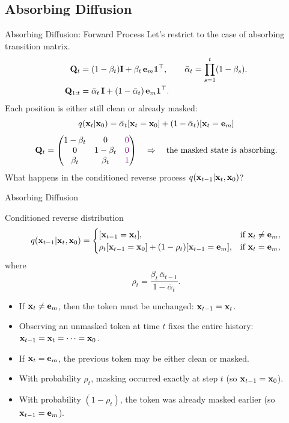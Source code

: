 \documentclass{beamer}
\begin{document}
\subsection{Absorbing Diffusion}
\begin{frame}{Absorbing Diffusion: Forward Process}
	Let's restrict to the case of absorbing transition matrix.
	\vspace{-0.3cm}
	\begin{align*}
		\mathbf{Q}_t &= (1-\beta_t)\mathbf{I} + \beta_t\, \mathbf{e}_m \mathbf{1}^\top,
		\qquad
		\bar\alpha_t = \prod_{s=1}^t (1-\beta_s). \\
		\mathbf{Q}_{1:t} &= \bar\alpha_t\,\mathbf{I} + (1-\bar\alpha_t)\,\mathbf{e}_m \mathbf{1}^\top.
	\end{align*}
	\eqpause
	Each position is either still clean or already masked:
	\[
		q(\mathbf{x}_t | \mathbf{x}_0) = \bar\alpha_t [\mathbf{x}_t = \mathbf{x}_0] + (1 - \bar\alpha_t) [\mathbf{x}_t = \mathbf{e}_m]
	\]
	\eqpause
	\[
		\mathbf{Q}_t =
		\begin{pmatrix}
			1-\beta_t & 0           & \color{violet}{0} \\
			0           & 1-\beta_t & \color{violet}{0} \\
			\beta_t     & \beta_t     & \color{violet}{1}
		\end{pmatrix} 
		\quad \Rightarrow \quad 
		\text{the masked state is absorbing.}
	\]
	\eqpause
	What happens in the conditioned reverse process
	$q(\mathbf{x}_{t-1} | \mathbf{x}_t, \mathbf{x}_0)$?
\end{frame}
\begin{frame}{Absorbing Diffusion}
	\begin{block}{Conditioned reverse distribution}
		\vspace{-0.5cm}
		\[
			q(\mathbf{x}_{t-1} | \mathbf{x}_t, \mathbf{x}_0) =
			\begin{cases}
				[\mathbf{x}_{t-1} = \mathbf{x}_t], 
				& \text{if } \mathbf{x}_t \neq \mathbf{e}_m, \\
				\rho_t[\mathbf{x}_{t-1} = \mathbf{x}_0] + (1-\rho_t)[\mathbf{x}_{t-1} = \mathbf{e}_m], 
				& \text{if } \mathbf{x}_t = \mathbf{e}_m,
			\end{cases}
		\]
		where
		\[
		\rho_t = \frac{\beta_t\,\bar\alpha_{t-1}}{1-\bar\alpha_t}.
		\]
	\end{block}
	\eqpause
	\begin{itemize}
		\item If $\mathbf{x}_t \neq \mathbf{e}_m$, then the token must be unchanged:
		$\mathbf{x}_{t-1} = \mathbf{x}_t$.
		\item Observing an unmasked token at time $t$ fixes the entire history:
		$\mathbf{x}_{t-1} = \mathbf{x}_t = \cdots = \mathbf{x}_0$.
		\eqpause
		\item If $\mathbf{x}_t = \mathbf{e}_m$, the previous token may be either clean or masked.
		\item With probability $\rho_t$, masking occurred exactly at step $t$
		(so $\mathbf{x}_{t-1} = \mathbf{x}_0$).
        \item With probability $(1 - \rho_t)$, the token was already masked earlier
		(so $\mathbf{x}_{t-1} = \mathbf{e}_m$).
	\end{itemize}
\end{frame}
\end{document}
